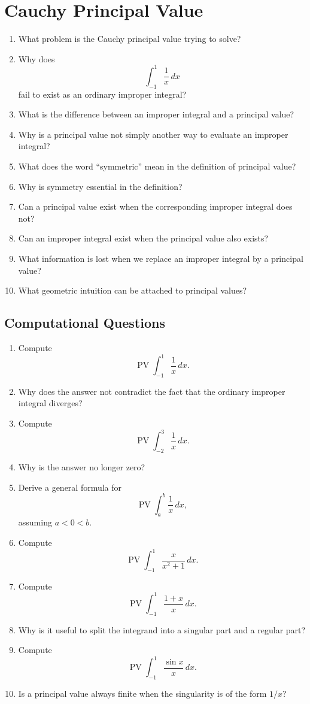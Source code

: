 \section{Cauchy Principal Value}

\begin{enumerate}
  \item What problem is the Cauchy principal value trying to solve?
  \item Why does
    \[ \int_{-1}^{1}\frac{1}{x}\,dx \]
    fail to exist as an ordinary improper integral?
  \item What is the difference between an improper integral and a principal value?
  \item Why is a principal value not simply another way to evaluate an improper integral?
  \item What does the word ``symmetric'' mean in the definition of principal value?
  \item Why is symmetry essential in the definition?
  \item Can a principal value exist when the corresponding improper integral does not?
  \item Can an improper integral exist when the principal value also exists?
  \item What information is lost when we replace an improper integral by a principal value?
  \item What geometric intuition can be attached to principal values?
\end{enumerate}

\subsection{Computational Questions}

\begin{enumerate}[resume]
  \item Compute
    \[ \operatorname{PV}\int_{-1}^{1}\frac{1}{x}\,dx. \]
  \item Why does the answer not contradict the fact that the ordinary improper integral diverges?
  \item Compute
    \[ \operatorname{PV}\int_{-2}^{3}\frac{1}{x}\,dx. \]
  \item Why is the answer no longer zero?
  \item Derive a general formula for
    \[ \operatorname{PV}\int_{a}^{b}\frac{1}{x}\,dx, \]
    assuming \(a<0<b\).
  \item Compute
    \[ \operatorname{PV}\int_{-1}^{1}\frac{x}{x^{2}+1}\,dx. \]
  \item Compute
    \[ \operatorname{PV}\int_{-1}^{1}\frac{1+x}{x}\,dx. \]
  \item Why is it useful to split the integrand into a singular part and a regular part?
  \item Compute
    \[ \operatorname{PV}\int_{-1}^{1}\frac{\sin x}{x}\,dx. \]
  \item Is a principal value always finite when the singularity is of the form \(1/x\)?
\end{enumerate}


